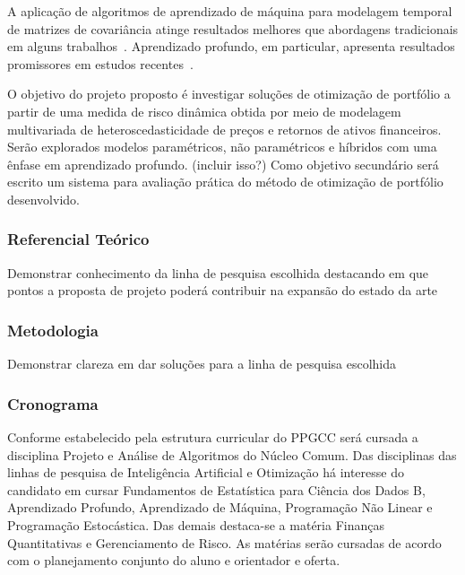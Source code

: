 \documentclass[a4paper, 12pt]{article}
\begin{document}
A aplicação de algoritmos de aprendizado de máquina para modelagem temporal de
matrizes de covariância atinge resultados melhores que abordagens tradicionais
em alguns trabalhos~\cite{svr, ann1, ann2}. Aprendizado profundo, em
particular, apresenta resultados promissores em estudos recentes~\cite{dl1,
dl2, dl3?}.

O objetivo do projeto proposto é investigar soluções de otimização de portfólio
a partir de uma medida de risco dinâmica obtida por meio de modelagem
multivariada de heteroscedasticidade de preços e retornos de ativos
financeiros. Serão explorados modelos paramétricos, não paramétricos e híbridos
com uma ênfase em aprendizado profundo. (incluir isso?) Como objetivo
secundário será escrito um sistema para avaliação prática do método de
otimização de portfólio desenvolvido.




\subsubsection*{Referencial Teórico}

Demonstrar conhecimento da linha de pesquisa escolhida destacando em que
pontos a proposta de projeto poderá contribuir na expansão do estado da arte

\subsubsection*{Metodologia}

Demonstrar clareza em dar soluções para a linha de pesquisa escolhida

\subsubsection*{Cronograma}

Conforme estabelecido pela estrutura curricular do PPGCC será cursada a
disciplina Projeto e Análise de Algoritmos do Núcleo Comum. Das disciplinas das
linhas de pesquisa de Inteligência Artificial e Otimização há interesse do
candidato em cursar Fundamentos de Estatística para Ciência dos Dados B,
Aprendizado Profundo, Aprendizado de Máquina, Programação Não Linear e
Programação Estocástica. Das demais destaca-se a matéria Finanças Quantitativas
e Gerenciamento de Risco. As matérias serão cursadas de acordo com o
planejamento conjunto do aluno e orientador e oferta.
\end{document}
